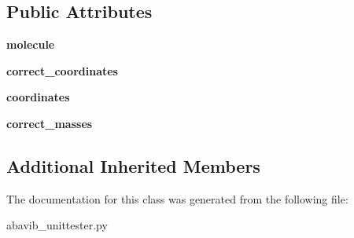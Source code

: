 \subsection*{Public Attributes}
\begin{DoxyCompactItemize}
\item 
\hypertarget{classabavib__unittester_1_1read__molecule__test_aa63a86b5182ed37df4e9c981a47aef83}{{\bfseries molecule}}\label{classabavib__unittester_1_1read__molecule__test_aa63a86b5182ed37df4e9c981a47aef83}

\item 
\hypertarget{classabavib__unittester_1_1read__molecule__test_a60cc70142230b595b961756e53cda062}{{\bfseries correct\+\_\+coordinates}}\label{classabavib__unittester_1_1read__molecule__test_a60cc70142230b595b961756e53cda062}

\item 
\hypertarget{classabavib__unittester_1_1read__molecule__test_a2303ff7a039d016a0ff8dea65c4bb39b}{{\bfseries coordinates}}\label{classabavib__unittester_1_1read__molecule__test_a2303ff7a039d016a0ff8dea65c4bb39b}

\item 
\hypertarget{classabavib__unittester_1_1read__molecule__test_ab58a35e57fc355d781fe03c4d904b6c9}{{\bfseries correct\+\_\+masses}}\label{classabavib__unittester_1_1read__molecule__test_ab58a35e57fc355d781fe03c4d904b6c9}

\end{DoxyCompactItemize}
\subsection*{Additional Inherited Members}


The documentation for this class was generated from the following file\+:\begin{DoxyCompactItemize}
\item 
abavib\+\_\+unittester.\+py\end{DoxyCompactItemize}
